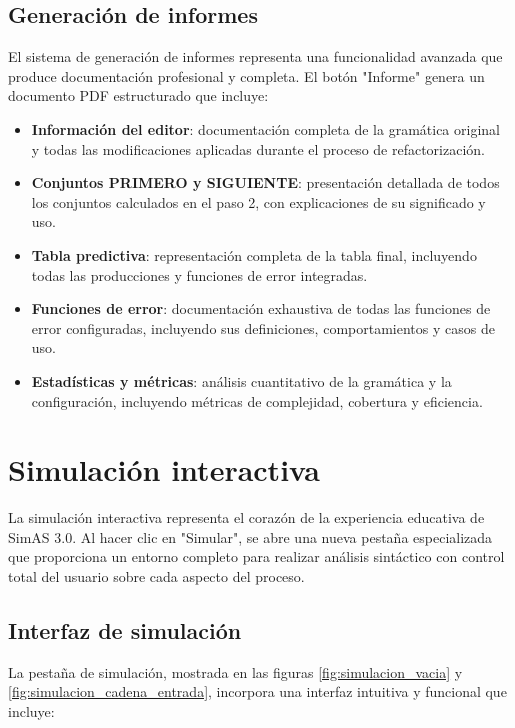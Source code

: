 \subsection{Generación de informes}

El sistema de generación de informes representa una funcionalidad avanzada que produce documentación profesional y completa. El botón \string"Informe\string" genera un documento PDF estructurado que incluye:

\begin{itemize}
    \item \textbf{Información del editor}: documentación completa de la gramática original y todas las modificaciones aplicadas durante el proceso de refactorización.
    \item \textbf{Conjuntos PRIMERO y SIGUIENTE}: presentación detallada de todos los conjuntos calculados en el paso 2, con explicaciones de su significado y uso.
    \item \textbf{Tabla predictiva}: representación completa de la tabla final, incluyendo todas las producciones y funciones de error integradas.
    \item \textbf{Funciones de error}: documentación exhaustiva de todas las funciones de error configuradas, incluyendo sus definiciones, comportamientos y casos de uso.
    \item \textbf{Estadísticas y métricas}: análisis cuantitativo de la gramática y la configuración, incluyendo métricas de complejidad, cobertura y eficiencia.
\end{itemize}

\section{Simulación interactiva}

La simulación interactiva representa el corazón de la experiencia educativa de SimAS 3.0. Al hacer clic en \string"Simular\string", se abre una nueva pestaña especializada que proporciona un entorno completo para realizar análisis sintáctico con control total del usuario sobre cada aspecto del proceso.

\subsection{Interfaz de simulación}

La pestaña de simulación, mostrada en las figuras \ref{fig:simulacion_vacia} y \ref{fig:simulacion_cadena_entrada}, incorpora una interfaz intuitiva y funcional que incluye:

